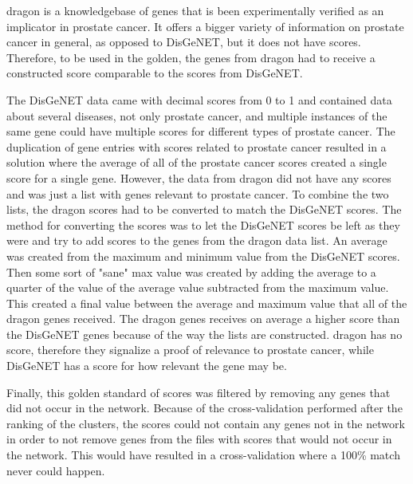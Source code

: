 \gls{dragon} is a knowledgebase of genes that is been experimentally verified as
an implicator in prostate cancer. It offers a bigger variety of information on
prostate cancer in general, as opposed to DisGeNET, but it does not have scores.
Therefore, to be used in the \gls{golden}, the genes from \gls{dragon} had to
receive a constructed score comparable to the scores from DisGeNET.

The DisGeNET data came with decimal scores from 0 to 1 and contained data about
several diseases, not only prostate cancer, and multiple instances of the same
gene could have multiple scores for different types of prostate cancer. The
duplication of gene entries with scores related to prostate cancer resulted in
a solution where the average of all of the prostate cancer scores created
a single score for a single gene. However, the data from \gls{dragon} did not
have any scores and was just a list with genes relevant to prostate cancer.  To
combine the two lists, the \gls{dragon} scores had to be converted to match the
DisGeNET scores. The method for converting the scores was to let the DisGeNET
scores be left as they were and try to add scores to the genes from the
\gls{dragon} data list. An average was created from the maximum and minimum
value from the DisGeNET scores. Then some sort of "sane" max value was created
by adding the average to a quarter of the value of the average value subtracted
from the maximum value.  This created a final value between the average and
maximum value that all of the \gls{dragon} genes received. The \gls{dragon}
genes receives on average a higher score than the DisGeNET genes because of the
way the lists are constructed. \gls{dragon} has no score, therefore they
signalize a proof of relevance to prostate cancer, while DisGeNET has a score
for how relevant the gene may be.

Finally, this golden standard of scores was filtered by removing any genes that
did not occur in the network. Because of the cross-validation performed after
the ranking of the clusters, the scores could not contain any genes not in the
network in order to not remove genes from the files with scores that would not
occur in the network. This would have resulted in a cross-validation where
a 100\% match never could happen.

